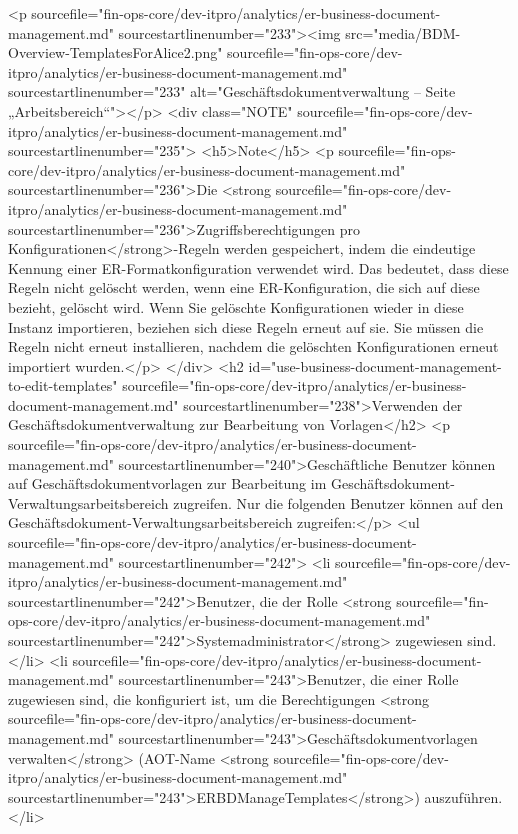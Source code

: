 <p sourcefile="fin-ops-core/dev-itpro/analytics/er-business-document-management.md" sourcestartlinenumber="233"><img src="media/BDM-Overview-TemplatesForAlice2.png" sourcefile="fin-ops-core/dev-itpro/analytics/er-business-document-management.md" sourcestartlinenumber="233" alt="Geschäftsdokumentverwaltung – Seite „Arbeitsbereich“"></p>
<div class="NOTE" sourcefile="fin-ops-core/dev-itpro/analytics/er-business-document-management.md" sourcestartlinenumber="235">
<h5>Note</h5>
<p sourcefile="fin-ops-core/dev-itpro/analytics/er-business-document-management.md" sourcestartlinenumber="236">Die <strong sourcefile="fin-ops-core/dev-itpro/analytics/er-business-document-management.md" sourcestartlinenumber="236">Zugriffsberechtigungen pro Konfigurationen</strong>-Regeln werden gespeichert, indem die eindeutige Kennung einer ER-Formatkonfiguration verwendet wird. Das bedeutet, dass diese Regeln nicht gelöscht werden, wenn eine ER-Konfiguration, die sich auf diese bezieht, gelöscht wird. Wenn Sie gelöschte Konfigurationen wieder in diese Instanz importieren, beziehen sich diese Regeln erneut auf sie. Sie müssen die Regeln nicht erneut installieren, nachdem die gelöschten Konfigurationen erneut importiert wurden.</p>
</div>
<h2 id="use-business-document-management-to-edit-templates" sourcefile="fin-ops-core/dev-itpro/analytics/er-business-document-management.md" sourcestartlinenumber="238">Verwenden der Geschäftsdokumentverwaltung zur Bearbeitung von Vorlagen</h2>
<p sourcefile="fin-ops-core/dev-itpro/analytics/er-business-document-management.md" sourcestartlinenumber="240">Geschäftliche Benutzer können auf Geschäftsdokumentvorlagen zur Bearbeitung im Geschäftsdokument-Verwaltungsarbeitsbereich zugreifen. Nur die folgenden Benutzer können auf den Geschäftsdokument-Verwaltungsarbeitsbereich zugreifen:</p>
<ul sourcefile="fin-ops-core/dev-itpro/analytics/er-business-document-management.md" sourcestartlinenumber="242">
<li sourcefile="fin-ops-core/dev-itpro/analytics/er-business-document-management.md" sourcestartlinenumber="242">Benutzer, die der Rolle <strong sourcefile="fin-ops-core/dev-itpro/analytics/er-business-document-management.md" sourcestartlinenumber="242">Systemadministrator</strong> zugewiesen sind.</li>
<li sourcefile="fin-ops-core/dev-itpro/analytics/er-business-document-management.md" sourcestartlinenumber="243">Benutzer, die einer Rolle zugewiesen sind, die konfiguriert ist, um die Berechtigungen <strong sourcefile="fin-ops-core/dev-itpro/analytics/er-business-document-management.md" sourcestartlinenumber="243">Geschäftsdokumentvorlagen verwalten</strong> (AOT-Name <strong sourcefile="fin-ops-core/dev-itpro/analytics/er-business-document-management.md" sourcestartlinenumber="243">ERBDManageTemplates</strong>) auszuführen.</li>
